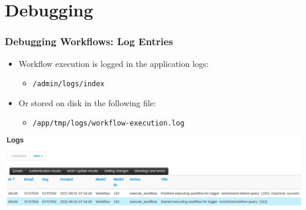 \section{Debugging}
\begin{frame}
    \frametitle{Debugging Workflows: Log Entries}
    \begin{itemize}
        \item Workflow execution is logged in the application logs:
        \begin{itemize}
            \item \texttt{/admin/logs/index}
        \end{itemize}
        \item Or stored on disk in the following file:
        \begin{itemize}
            \item \texttt{/app/tmp/logs/workflow-execution.log}
        \end{itemize}
    \end{itemize}
    \begin{center}
        \includegraphics[width=1.0\linewidth]{pictures/workflow-debug.png}
    \end{center}
\end{frame}

